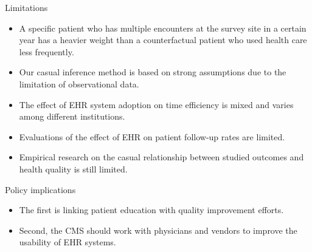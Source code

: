 \documentclass[10pt, compress]{beamer}
\begin{document}
\begin{frame}{Limitations}

     
      \begin{itemize}
        \item A specific patient who has multiple encounters at the survey site in a certain year has a heavier weight than a counterfactual patient who used health care less frequently. 
        \item Our casual inference method is based on strong assumptions due to the limitation of observational data. 
        \item The effect of EHR system adoption on time efficiency is mixed and varies among different institutions.
        \item Evaluations of the effect of EHR on patient follow-up rates are limited.
        \item Empirical research on the casual relationship between studied outcomes and health quality is still limited.
      \end{itemize}

\end{frame}

\begin{frame}{Policy implications}

     
      \begin{itemize}
        \item The first is linking patient education with quality improvement efforts.
        \item Second, the CMS should work with physicians and vendors to improve the usability of EHR systems. 
      \end{itemize}

\end{frame}

\end{document}
